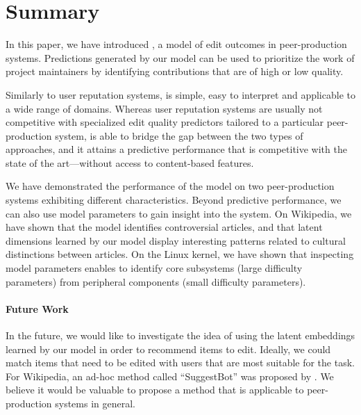 \section{Summary}
\label{pps:sec:conclusion}

In this paper, we have introduced \interank{}, a model of edit outcomes in peer-production systems.
Predictions generated by our model can be used to prioritize the work of project maintainers by identifying contributions that are of high or low quality.

Similarly to user reputation systems, \interank{} is simple, easy to interpret and applicable to a wide range of domains.
Whereas user reputation systems are usually not competitive with specialized edit quality predictors tailored to a particular peer-production system, \interank{} is able to bridge the gap between the two types of approaches, and it attains a predictive performance that is competitive with the state of the art---without access to content-based features.

We have demonstrated the performance of the model on two peer-production systems exhibiting different characteristics.
Beyond predictive performance, we can also use model parameters to gain insight into the system.
On Wikipedia, we have shown that the model identifies controversial articles, and that latent dimensions learned by our model display interesting patterns related to cultural distinctions between articles.
On the Linux kernel, we have shown that inspecting model parameters enables to identify core subsystems (large difficulty parameters) from peripheral components (small difficulty parameters).

\paragraph{Future Work}
In the future, we would like to investigate the idea of using the latent embeddings learned by our model in order to recommend items to edit.
Ideally, we could match items that need to be edited with users that are most suitable for the task.
For Wikipedia, an ad-hoc method called ``SuggestBot'' was proposed by \citet{cosley2007suggestbot}.
We believe it would be valuable to propose a method that is applicable to peer-production systems in general.
